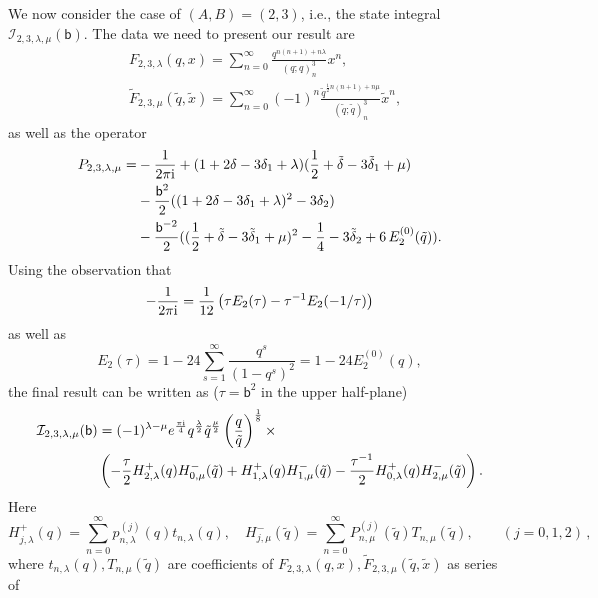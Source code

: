 \documentclass[12pt,reqno]{amsart}
\theoremstyle{definition}
\def\calI{\mathcal I}
\def\calI{\mathcal I}
\def\tq{\tilde{q}}
\def\bb{\mathsf{b}}
\def\ri{\mathrm{i}}
\def\wt{\widetilde}
\def\tx{\tilde{x}}
\def\ri{{\rm i}}
\begin{document}
  We now consider the case of $(A,B)=(2,3)$, i.e., the state integral
  $\calI_{2,3,\lambda,\mu}(\bb)$.
  The data we need to present our result are
  \begin{align}
    &F_{2,3,\lambda}(q,x) =
      \sum_{n=0}^\infty \frac{q^{n(n+1)+n\lambda}}{(q;q)_n^3}x^n,\\
    &\wt{F}_{2,3,\mu}(\tq,\tx) =
    \sum_{n=0}^\infty (-1)^n
    \frac{\tq^{\frac{1}{2}n(n+1)+n\mu}}{(\tq;\tq)_n^3}\tx^n,
  \end{align}
  as well as the operator
  \begin{align}
    P_{2,3,\lambda,\mu} =
    &-\frac{1}{2\pi\ri}+(1+2\delta-3\delta_1+\lambda)
      (\frac{1}{2}+\tilde{\delta} -3\tilde{\delta}_1 + \mu)\\
    &-\frac{\bb^2}{2}((1+2\delta-3\delta_1+\lambda)^2-3\delta_2)\\
    &-\frac{\bb^{-2}}{2}((\frac{1}{2}+\tilde{\delta} -3\tilde{\delta}_1
      + \mu)^2-\frac{1}{4}-3\tilde{\delta}_2 + 6\,
      E_2^{(0)}(\tq)).
  \end{align}
  Using the observation that
  \begin{equation}
    -\frac{1}{2\pi\ri} = \frac{1}{12}\left(\tau E_2(\tau) -
      \tau^{-1}E_2(-1/\tau)\right) 
  \end{equation}
  as well as
  \begin{equation}
    E_2(\tau) = 1-24\sum_{s=1}^\infty \frac{q^s}{(1-q^s)^2}
    = 1-24 E_2^{(0)}(q),
  \end{equation}
  the final result can be written as ($\tau = \bb^2$ in the upper half-plane)
  \begin{align}
    \calI_{2,3,\lambda,\mu}(\bb)
    &=
      (-1)^{\lambda-\mu}
      e^{\frac{\pi\ri}{4}}q^{\frac{\lambda}{2}}\tq^{\frac{\mu}{2}}
      \left(\frac{q}{\tq}\right)^{\frac{1}{8}}\times \\
    &\left(-\frac{\tau}{2}H_{2,\lambda}^{+}(q)H_{0,\mu}^{-}(\tq)
      +H_{1,\lambda}^{+}(q)H_{1,\mu}^{-}(\tq)
      -\frac{\tau^{-1}}{2}H_{0,\lambda}^{+}(q)H_{2,\mu}^{-}(\tq)\right).
      \label{eq:I23lm}
  \end{align}
  Here
  \begin{equation}
    H_{j,\lambda}^{+}(q) = \sum_{n=0}^\infty
    p_{n,\lambda}^{(j)}(q)t_{n,\lambda}(q),\quad
    H_{j,\mu}^{-}(\tq) = \sum_{n=0}^\infty
    P_{n,\mu}^{(j)}(\tq) T_{n,\mu}(\tq),\qquad (j=0,1,2) \,,
    \label{eq:gHpm}
  \end{equation}
  where $t_{n,\lambda}(q),T_{n,\mu}(\tq)$ are coefficients of
  $F_{2,3,\lambda}(q,x), \wt{F}_{2,3,\mu}(\tq,\tx)$ as series of
\end{document}
